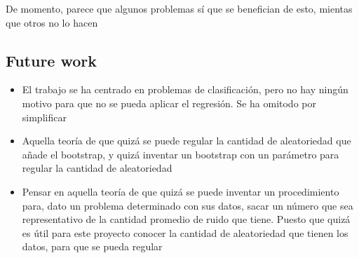 De momento, parece que algunos problemas sí que se benefician de esto, mientas
que otros no lo hacen


\subsection*{Future work}
\begin{itemize}
 \item El trabajo se ha centrado en problemas de clasificación, pero no hay
       ningún motivo para que no se pueda aplicar el regresión. Se ha omitodo por
       simplificar
 \item Aquella teoría de que quizá se puede regular la cantidad de aleatoriedad
       que añade el bootstrap, y quizá inventar un bootstrap con un parámetro para
       regular la cantidad de aleatoriedad
 \item Pensar en aquella teoría de que quizá se puede inventar un procedimiento
       para, dato un problema determinado con sus datos, sacar un número que sea
       representativo de la cantidad promedio de ruido que tiene. Puesto que quizá
       es útil para este proyecto conocer la cantidad de aleatoriedad que tienen
       los datos, para que se pueda regular
\end{itemize}

